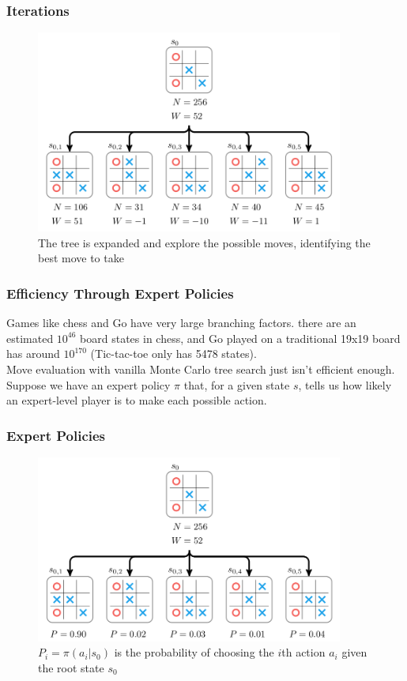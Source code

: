 \documentclass[notheorems, aspectratio=54]{beamer}
\begin{document}
\begin{frame}
    \frametitle{Iterations}

    \begin{figure}
        \includegraphics[width=0.9\textwidth]{fig/mcts_iterations.png}
        \caption{The tree is expanded and explore the possible moves, identifying the best move to take}
    \end{figure}
\end{frame}

\begin{frame}
    \frametitle{Efficiency Through Expert Policies}

    Games like chess and Go have very large branching factors. there are an estimated $10^{46}$ board states in chess, and Go played on a traditional 19x19 board has around $10^{170}$ (Tic-tac-toe only has 5478 states).
    \\[2em]
    Move evaluation with vanilla Monte Carlo tree search just isn't efficient enough.
    \\[2em]
    Suppose we have an expert policy $\pi$ that, for a given state $s$, tells us how likely an expert-level player is to make each possible action.
\end{frame}

\begin{frame}
    \frametitle{Expert Policies}

    \begin{figure}
        \includegraphics[width=0.9\textwidth]{fig/expert_policies.png}
        \caption{$P_i=\pi(a_i | s_0)$ is the probability of choosing the $i$th action $a_i$ given the root state $s_0$}
    \end{figure}
\end{frame}
\end{document}
